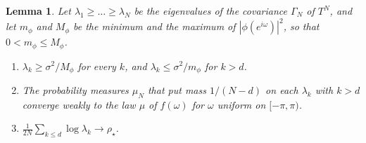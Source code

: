 \documentclass[11pt,onecolumn]{IEEEtran}
\newtheorem{lemma}[theorem]{Lemma}
\begin{document}
\begin{lemma}\label{lem:arspec}
Let $\lambda_1\ge\dots\ge\lambda_N$ be the eigenvalues of the covariance
$\Gamma_N$ of $T^N$, and let $m_\phi$ and $M_\phi$ be the minimum and the
maximum of $|\phi(e^{i\omega})|^2$, so that $0<m_\phi\le M_\phi$.
\begin{enumerate}
\item[(a)] $\lambda_k\ge\sigma^2/M_\phi$ for every $k$, and
$\lambda_k\le\sigma^2/m_\phi$ for $k>d$.
\item[(b)] The probability measures $\mu_N$ that put mass $1/(N-d)$ on
each $\lambda_k$ with $k>d$ converge weakly to the law $\mu$ of
$f(\omega)$ for $\omega$ uniform on $[-\pi,\pi)$.
\item[(c)] $\frac1{2N}\sum_{k\le d}\log\lambda_k\to\rho_\star$.
\end{enumerate}
\end{lemma}
\end{document}
